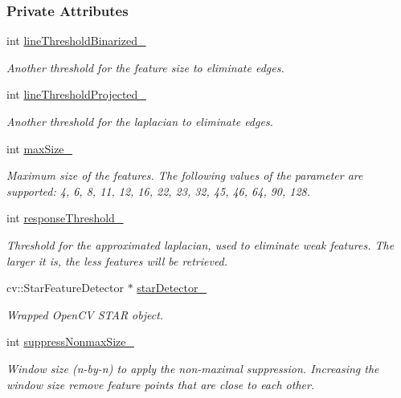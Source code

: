 \subsubsection*{Private Attributes}
\begin{DoxyCompactItemize}
\item 
int \hyperlink{group___feature_extractor_aea296c8f5cdf67ae340aac32f9512906}{line\-Threshold\-Binarized\-\_\-}
\begin{DoxyCompactList}\small\item\em Another threshold for the feature size to eliminate edges. \end{DoxyCompactList}\item 
int \hyperlink{group___feature_extractor_ab01cd66c7c27def6dcf03915c83085ad}{line\-Threshold\-Projected\-\_\-}
\begin{DoxyCompactList}\small\item\em Another threshold for the laplacian to eliminate edges. \end{DoxyCompactList}\item 
int \hyperlink{group___feature_extractor_a03553a6b73fb075fa1bc1813b91b2079}{max\-Size\-\_\-}
\begin{DoxyCompactList}\small\item\em Maximum size of the features. The following values of the parameter are supported\-: 4, 6, 8, 11, 12, 16, 22, 23, 32, 45, 46, 64, 90, 128. \end{DoxyCompactList}\item 
int \hyperlink{group___feature_extractor_a85a6ef809bb695a64de0bb5d4121e28a}{response\-Threshold\-\_\-}
\begin{DoxyCompactList}\small\item\em Threshold for the approximated laplacian, used to eliminate weak features. The larger it is, the less features will be retrieved. \end{DoxyCompactList}\item 
cv\-::\-Star\-Feature\-Detector $\ast$ \hyperlink{group___feature_extractor_ae7fdbb1aee60f2289f5d187025a7d094}{star\-Detector\-\_\-}
\begin{DoxyCompactList}\small\item\em Wrapped Open\-C\-V S\-T\-A\-R object. \end{DoxyCompactList}\item 
int \hyperlink{group___feature_extractor_a36265d51f6a800441c974579ab4f6801}{suppress\-Nonmax\-Size\-\_\-}
\begin{DoxyCompactList}\small\item\em Window size (n-\/by-\/n) to apply the non-\/maximal suppression. Increasing the window size remove feature points that are close to each other. \end{DoxyCompactList}\end{DoxyCompactItemize}



